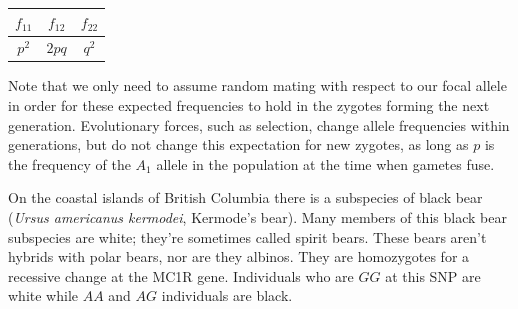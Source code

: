 {{

\begin{center}
\begin{tabular}{ccc}
\hline
$f_{11}$ & $f_{12}$ & $f_{22}$ \\
\hline
$p^2$ & $2pq$ & $q^2$ \\
\end{tabular}
\end{center}
Note that we only need to assume random mating with respect to our focal allele in order for these expected frequencies to hold in the zygotes forming the next generation. Evolutionary forces, such as selection, change allele frequencies within generations, but do not change this expectation for new zygotes, as long as $p$ is the frequency of the $A_1$ allele in the population at the time when gametes fuse.

\begin{question}
On the coastal islands of British Columbia there is a subspecies of
black bear (\textit{Ursus americanus kermodei}, Kermode's bear). Many members of this
black bear subspecies are white; they're sometimes called spirit bears. These
bears aren't hybrids with polar bears, nor are they albinos. They are
homozygotes for a recessive change at the MC1R gene. Individuals who
are $GG$ at this SNP are white while $AA$ and $AG$ individuals are black.




\end{question}}}
